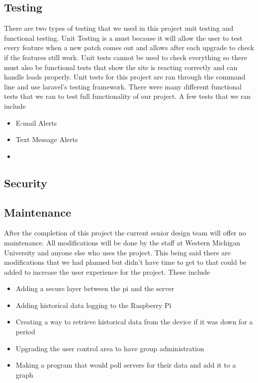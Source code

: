 \documentclass{report}
\begin{document}
\subsection*{Testing}
There are two types of testing that we used in this project unit testing and functional testing. Unit Testing is a must because it will allow the user to test every feature when a new patch comes out and allows after each upgrade to check if the features still work. Unit tests cannot be used to check everything so there must also be functional tests that show the site is reacting correctly and can handle loads properly.
\newline
\indent
Unit tests for this project are ran through the command line and use laravel's testing framework. 
\newline
\indent
There were many different functional tests that we ran to test full functionality of our project. A few tests that we ran include
\begin {itemize}
\item E-mail Alerts
\item Text Message Alerts
\item 
\end {itemize}

\newpage
\subsection*{Security}
\newpage

\subsection*{Maintenance}
After the completion of this project the current senior design team will offer no maintenance. All modifications will be done by the staff at Western Michigan University and anyone else who uses the project. This being said there are modifications that we had planned but didn't have time to get to that could be added to increase the user experience for the project. These include
\begin {itemize}
\item Adding a secure layer between the pi and the server
\item Adding historical data logging to the Raspberry Pi
\item Creating a way to retrieve historical data from the device if it was down for a period
\item Upgrading the user control area to have group administration
\item Making a program that would poll servers for their data and add it to a graph
\end {itemize}
\newpage
\end{document}

